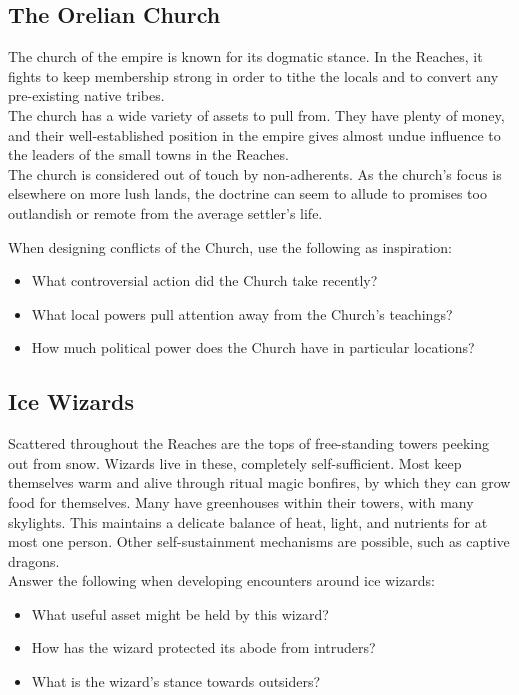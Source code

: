 \documentclass[notitlepage]{article}
\begin{document}
\begin{multicols}{2}
  \subsection*{The Orelian Church}

  The church of the empire is known for its dogmatic stance.
  In the Reaches, it fights to keep membership strong in order to tithe the locals and to convert any pre-existing native tribes. \\
  
  The church has a wide variety of assets to pull from.
  They have plenty of money, and their well-established position in the empire gives almost undue influence to the leaders of the small towns in the Reaches. \\

  The church is considered out of touch by non-adherents.
  As the church's focus is elsewhere on more lush lands, the doctrine can seem to allude to promises too outlandish or remote from the average settler's life.

  When designing conflicts of the Church, use the following as inspiration:

  \begin{itemize}
  \item What controversial action did the Church take recently?
  \item What local powers pull attention away from the Church's teachings?
  \item How much political power does the Church have in particular locations?
  \end{itemize}

  \subsection*{Ice Wizards}

  Scattered throughout the Reaches are the tops of free-standing towers peeking out from snow.
  Wizards live in these, completely self-sufficient.
  Most keep themselves warm and alive through ritual magic bonfires, by which they can grow food for themselves.
  Many have greenhouses within their towers, with many skylights.
  This maintains a delicate balance of heat, light, and nutrients for at most one person.
  Other self-sustainment mechanisms are possible, such as captive dragons. \\

  Answer the following when developing encounters around ice wizards:

  \begin{itemize}
  \item What useful asset might be held by this wizard?
  \item How has the wizard protected its abode from intruders?
  \item What is the wizard's stance towards outsiders?
  \end{itemize}


\end{multicols}
\end{document}
